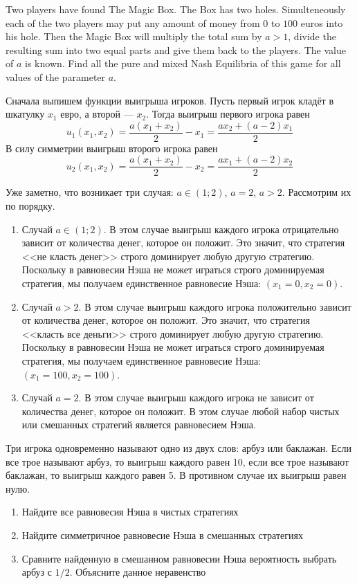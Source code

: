 \begin{problem}
Two players have found The Magic Box. The Box has two holes. Simulteneously each of the two players may put any amount of money from $0$ to $100$ euros into his hole. Then the Magic Box will multiply the total sum by $a>1$, divide the resulting sum into two equal parts and give them back to the players. The value of $a$ is known. Find all the pure and mixed Nash Equilibria of this game for all values of the parameter $a$.
\end{problem}

\begin{solution}
Сначала выпишем функции выигрыша игроков. Пусть первый игрок кладёт в шкатулку $x_1$ евро, а второй --- $x_2$. Тогда выигрыш первого игрока равен
\[
u_1(x_1,x_2)=\frac{a(x_1+x_2)}{2} - x_1=\frac{ax_2+(a-2)x_1}{2}
\]
В силу симметрии выигрыш второго игрока равен
\[
u_2(x_1,x_2)=\frac{a(x_1+x_2)}{2} - x_2=\frac{ax_1+(a-2)x_2}{2}
\]

Уже заметно, что возникает три случая: $a \in (1;2)$, $a=2$, $a>2$. Рассмотрим их по порядку.
\begin{enumerate}
\item Случай $a\in(1;2)$. В этом случае выигрыш каждого игрока отрицательно зависит от количества денег, которое он положит. Это значит, что стратегия <<не класть денег>> строго доминирует любую другую стратегию. Поскольку в равновесии Нэша не может играться строго доминируемая стратегия, мы получаем единственное равновесие Нэша: $(x_1=0, x_2=0)$.

\item Случай $a>2$. В этом случае выигрыш каждого игрока положительно зависит от количества денег, которое он положит. Это значит, что стратегия <<класть все деньги>> строго доминирует любую другую стратегию. Поскольку в равновесии Нэша не может играться строго доминируемая стратегия, мы получаем единственное равновесие Нэша: $(x_1=100, x_2=100)$.

\item Случай $a=2$. В этом случае выигрыш каждого игрока не зависит от количества денег, которое он положит. В этом случае любой набор чистых или смешанных стратегий является равновесием Нэша.

\end{enumerate}
\end{solution}

\begin{problem}
Три игрока одновременно называют одно из двух слов: арбуз или баклажан. Если все трое называют арбуз, то выигрыш каждого равен 10, если все трое называют баклажан, то  выигрыш каждого равен 5. В противном случае их выигрыш равен нулю.
\begin{enumerate}
\item Найдите все равновесия Нэша в чистых стратегиях
\item Найдите симметричное равновесие  Нэша в смешанных стратегиях
\item Сравните найденную в смешанном равновесии Нэша вероятность выбрать арбуз с $1/2$. Объясните данное неравенство
\end{enumerate}
\end{problem}

